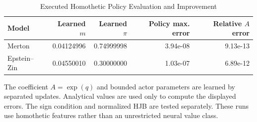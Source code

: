 \begin{table}[tbp]
\centering
\caption{Executed Homothetic Policy Evaluation and Improvement}
\label{tab:recursive}
\small
\begin{tabular}{@{}lrrrr@{}}
\toprule
Model & Learned $m$ & Learned $\pi$ & Policy max. error & Relative $A$ error \\
\midrule
Merton & 0.04124996 & 0.74999998 & 3.94e-08 & 9.13e-13 \\
Epstein--Zin & 0.04550010 & 0.30000000 & 1.03e-07 & 6.89e-12 \\
\bottomrule
\end{tabular}
\par\smallskip\begin{minipage}{\linewidth}\footnotesize The coefficient $A=\exp(q)$ and bounded actor parameters are learned by separated updates. Analytical values are used only to compute the displayed errors. The sign condition and normalized HJB are tested separately. These runs use homothetic features rather than an unrestricted neural value class.\end{minipage}
\end{table}
